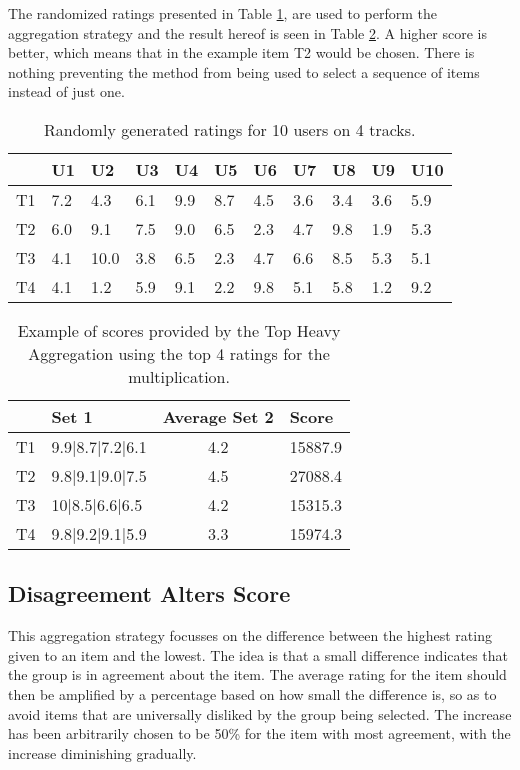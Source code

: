 The randomized ratings presented in Table \ref{tbl:randomdatasample}, are used to perform the aggregation strategy and the result hereof is seen in Table \ref{tbl:topheavyaggregation}. A higher score is better, which means that in the example item T2 would be chosen. There is nothing preventing the method from being used to select a sequence of items instead of just one.

\begin{table}[H]
	\centering
	\begin{tabular}{|l|l|l|l|l|l|l|l|l|l|l|}
		\hline
		& U1  & U2   & U3  & U4  & U5  & U6  & U7  & U8  & U9  & U10 \\ \hline
		T1 & 7.2 & 4.3  & 6.1 & 9.9 & 8.7 & 4.5 & 3.6 & 3.4 & 3.6 & 5.9 \\ \hline
		T2 & 6.0 & 9.1  & 7.5 & 9.0 & 6.5 & 2.3 & 4.7 & 9.8 & 1.9 & 5.3 \\ \hline
		T3 & 4.1 & 10.0 & 3.8 & 6.5 & 2.3 & 4.7 & 6.6 & 8.5 & 5.3 & 5.1 \\ \hline
		T4 & 4.1 & 1.2  & 5.9 & 9.1 & 2.2 & 9.8 & 5.1 & 5.8 & 1.2 & 9.2 \\ \hline
	\end{tabular}
	\caption{Randomly generated ratings for 10 users on 4 tracks.}
	\label{tbl:randomdatasample}
\end{table}

\begin{table}[H]
	\centering
	\begin{tabular}{|l|l|c|l|}
		\hline
		& Set 1           & \multicolumn{1}{l|}{Average Set 2} & Score   \\ \hline
		T1 & 9.9|8.7|7.2|6.1 & 4.2                                & 15887.9 \\ \hline
		T2 & 9.8|9.1|9.0|7.5 & 4.5                                & 27088.4 \\ \hline
		T3 & 10|8.5|6.6|6.5  & 4.2                                & 15315.3 \\ \hline
		T4 & 9.8|9.2|9.1|5.9 & 3.3                                & 15974.3 \\ \hline
	\end{tabular}
	\caption{Example of scores provided by the Top Heavy Aggregation using the top 4 ratings for the multiplication.}
	\label{tbl:topheavyaggregation}
\end{table}

\subsection{Disagreement Alters Score}
This aggregation strategy focusses on the difference between the highest rating given to an item and the lowest. The idea is that a small difference indicates that the group is in agreement about the item.
The average rating for the item should then be amplified by a percentage based on how small the difference is, so as to avoid items that are universally disliked by the group being selected. The increase has been arbitrarily chosen to be 50\% for the item with most agreement, with the increase diminishing gradually.

